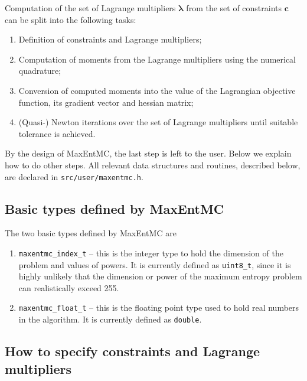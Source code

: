 \documentclass[12pt]{amsart}
\numberwithin{equation}{section}
\newcommand\BS{\boldsymbol}
\begin{document}
Computation of the set of Lagrange multipliers $\BS\lambda$ from the
set of constraints $\BS c$ can be split into the following tasks:
%
\begin{enumerate}
\item Definition of constraints and Lagrange multipliers;
\item Computation of moments from the Lagrange multipliers using the
  numerical quadrature;
\item Conversion of computed moments into the value of the Lagrangian
  objective function, its gradient vector and hessian matrix;
\item (Quasi-) Newton iterations over the set of Lagrange multipliers
  until suitable tolerance is achieved.
\end{enumerate}
%
By the design of MaxEntMC, the last step is left to the user. Below we
explain how to do other steps. All relevant data structures and
routines, described below, are declared in
\texttt{src/user/maxentmc.h}.

\subsection{Basic types defined by MaxEntMC}

The two basic types defined by MaxEntMC are
%
\begin{enumerate}
\item \texttt{maxentmc\_index\_t} -- this is the integer type to hold
  the dimension of the problem and values of powers. It is currently
  defined as \texttt{uint8\_t}, since it is highly unlikely that the
  dimension or power of the maximum entropy problem can realistically
  exceed 255.
\item \texttt{maxentmc\_float\_t} -- this is the floating point type
  used to hold real numbers in the algorithm. It is currently defined
  as \texttt{double}.
\end{enumerate}

\subsection{How to specify constraints and Lagrange multipliers}
\label{sec:constraints}
\end{document}
